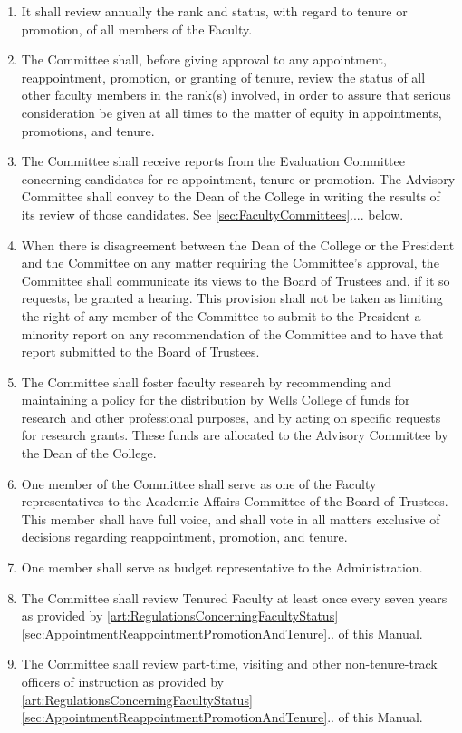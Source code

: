 \documentclass{manual}
\newcommand{\itemLevelA}{\alph*.}
\newcommand{\itemLevelB}{\arabic*)}
\newcommand{\itemRefA}{\alph*}
\newcommand{\itemRefB}{\arabic*}
\begin{document}
\begin{enumerate}[label=\itemLevelA,ref=\itemRefA]
\begin{enumerate}[label=\itemLevelB,ref=\itemRefB]
\item It shall review annually the rank and status, with regard to tenure or promotion, of all members of the Faculty.
\item The Committee shall, before giving approval to any appointment, reappointment, promotion, or granting of tenure, review the status of all other faculty members in the rank(s) involved, in order to assure that serious consideration be given at all times to the matter of equity in appointments, promotions, and tenure.
\item The Committee shall receive reports from the Evaluation Committee concerning candidates for re-appointment, tenure or promotion. The Advisory Committee shall convey to the Dean of the College in writing the results of its review of those candidates. See \cref{sec:FacultyCommittees}.... below.
\item When there is disagreement between the Dean of the College or the President and the Committee on any matter requiring the Committee's approval, the Committee shall communicate its views to the Board of Trustees and, if it so requests, be granted a hearing. This provision shall not be taken as limiting the right of any member of the Committee to submit to the President a minority report on any recommendation of the Committee and to have that report submitted to the Board of Trustees.
\item The Committee shall foster faculty research by recommending and maintaining a policy for the distribution by Wells College of funds for research and other professional purposes, and by acting on specific requests for research grants. These funds are allocated to the Advisory Committee by the Dean of the College.
\item One member of the Committee shall serve as one of the Faculty representatives to the Academic Affairs Committee of the Board of Trustees. This member shall have full voice, and shall vote in all matters exclusive of decisions regarding reappointment, promotion, and tenure.
\item One member shall serve as budget representative to the Administration.
\item The Committee shall review Tenured Faculty at least once every seven years as provided by \cref{art:RegulationsConcerningFacultyStatus} \cref{sec:AppointmentReappointmentPromotionAndTenure}.. of this Manual.
\item The Committee shall review part-time, visiting and other non-tenure-track officers of instruction as provided by \cref{art:RegulationsConcerningFacultyStatus} \cref{sec:AppointmentReappointmentPromotionAndTenure}.. of this Manual.


\end{enumerate}
\end{enumerate}
\end{document}
